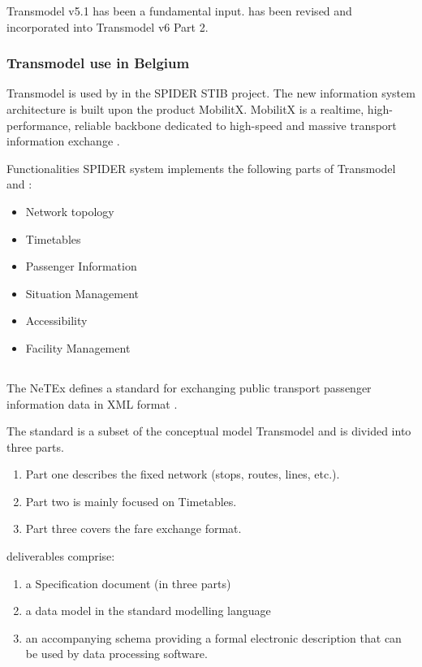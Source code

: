 Transmodel v5.1 has been a fundamental input.  has been revised and incorporated into Transmodel v6 Part 2.
\subsubsection{Transmodel use in Belgium}
Transmodel is used by  in the SPIDER STIB project. The new information system architecture is built upon the product MobilitX. MobilitX is a realtime, high-performance, reliable backbone dedicated to high-speed and massive transport information exchange \cite{noauthor_transmodel_nodate}.

Functionalities SPIDER  system implements the following parts of Transmodel and :
\begin{itemize}
    \item Network topology
    \item Timetables
    \item Passenger Information
    \item Situation Management
    \item Accessibility
    \item Facility Management
\end{itemize}

\subsection{}
The NeTEx defines a standard for exchanging public transport passenger information data in XML format \cite{noauthor_downloads_nodate}.  

The standard is a subset of the  conceptual model Transmodel and is divided into three parts. \begin{enumerate}
    \item Part one describes the fixed network (stops, routes, lines, etc.).
    \item Part two is mainly focused on Timetables.
    \item Part three covers the fare exchange format.
\end{enumerate}

 deliverables comprise: \begin{enumerate}
    \item a  Specification document (in three parts)
    \item a data model in the standard  modelling language
    \item an accompanying  schema providing a formal electronic description that can be used by data processing software.
\end{enumerate}

